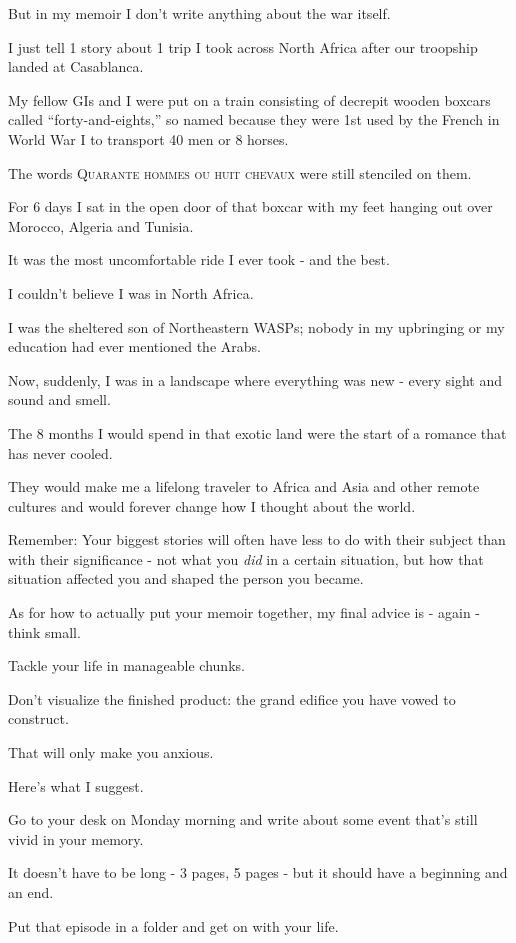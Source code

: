 \documentclass{book}
\numberwithin{equation}{section}
\begin{document}
But in my memoir I don't write anything about the war itself.

I just tell 1 story about 1 trip I took across North Africa after our troopship landed at Casablanca.

My fellow GIs and I were put on a train consisting of decrepit wooden boxcars called ``forty-and-eights,'' so named because they were 1st used by the French in World War I to transport 40 men or 8 horses.

The words \textsc{Quarante hommes ou huit chevaux} were still stenciled on them.

%
For 6 days I sat in the open door of that boxcar with my feet hanging out over Morocco, Algeria and Tunisia.

It was the most uncomfortable ride I ever took - and the best.

I couldn't believe I was in North Africa.

I was the sheltered son of Northeastern WASPs; nobody in my upbringing or my education had ever mentioned the Arabs.

Now, suddenly, I was in a landscape where everything was new - every sight and sound and smell.

The 8 months I would spend in that exotic land were the start of a romance that has never cooled.

They would make me a lifelong traveler to Africa and Asia and other remote cultures and would forever change how I thought about the world.

%
Remember: Your biggest stories will often have less to do with their subject than with their significance - not what you \textit{did} in a certain situation, but how that situation affected you and shaped the person you became.

%
As for how to actually put your memoir together, my final advice is - again - think small.

Tackle your life in manageable chunks.

Don't visualize the finished product: the grand edifice you have vowed to construct.

That will only make you anxious.

%
Here's what I suggest.

%
Go to your desk on Monday morning and write about some event that's still vivid in your memory.

It doesn't have to be long - 3 pages, 5 pages - but it should have a beginning and an end.

Put that episode in a folder and get on with your life.
\end{document}
